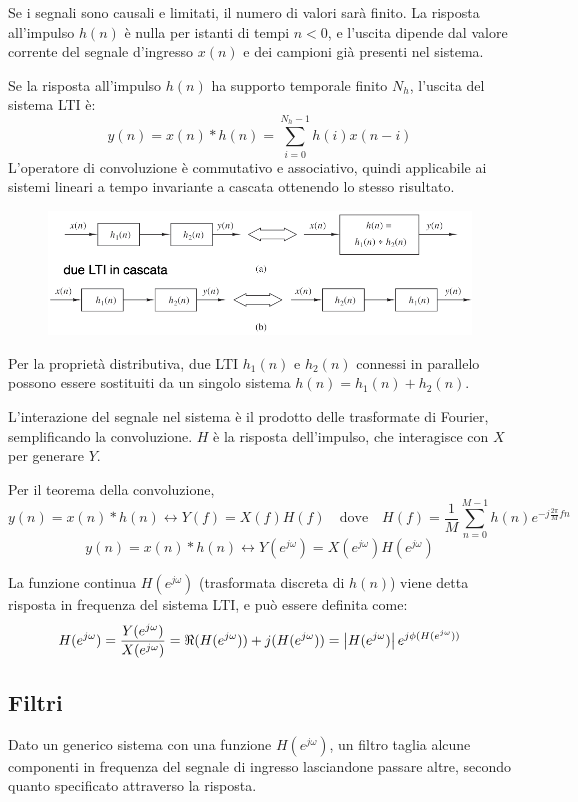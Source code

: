 Se i segnali sono causali e limitati, il numero di valori sarà finito. La risposta all'impulso $h(n)$ è nulla per istanti di tempi $n < 0$, e l'uscita dipende dal valore corrente del segnale d'ingresso $x(n)$ e dei campioni già presenti nel sistema. 

Se la risposta all'impulso $h(n)$ ha supporto temporale finito $N_h$, l'uscita del sistema LTI è:
$$y(n) = x(n) * h(n) = \sum_{i=0}^{N_h-1}h(i)x(n - i)$$
L'operatore di convoluzione è commutativo e associativo, quindi applicabile ai sistemi lineari a tempo invariante a cascata ottenendo lo stesso risultato.

\begin{figure}[h]
	\centering
	\includegraphics[scale=0.4]{Lezioni/Immagini/associativa}
\end{figure}

Per la proprietà distributiva, due LTI $h_1(n)$ e $h_2(n)$ connessi in parallelo possono essere sostituiti da un singolo sistema $h(n) = h_1(n) + h_2(n)$.

L'interazione del segnale nel sistema è il prodotto delle trasformate di Fourier, semplificando la convoluzione. $H$ è la risposta dell'impulso, che interagisce con $X$ per generare $Y$.  

Per il teorema della convoluzione, 
$$y(n) = x(n) * h(n) \leftrightarrow Y(f) = X(f)H(f) \quad \text{dove}\quad H(f) = \frac{1}{M} \sum_{n=0}^{M-1} h(n) e^{-j\frac{2\pi}{M}fn}$$
$$y(n) = x(n) * h(n) \leftrightarrow Y(e^{j\omega}) = X(e^{j\omega}) H(e^{j\omega})$$

La funzione continua $H(e^{j\omega})$ (trasformata discreta di $h(n)$) viene detta risposta in frequenza del sistema LTI, e può essere definita come:
$$H(e^{j\omega}) = \frac{Y(e^{j\omega})}{X(e^{j\omega})} = \Re(H(e^{j\omega})) + j(H(e^{j\omega})) = \left|H(e^{j\omega})\right| e^{j\phi(H(e^{j\omega}))}$$

\subsection{Filtri}
Dato un generico sistema con una funzione $H(e^{j\omega})$, un filtro taglia alcune componenti in frequenza del segnale di ingresso lasciandone passare altre, secondo quanto specificato attraverso la risposta. 

